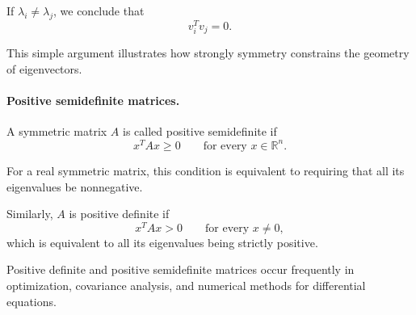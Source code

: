 \documentclass[14pt,letterpaper]{article}
\theoremstyle{plain}
\theoremstyle{definition}
\theoremstyle{remark}
\newcommand{\R}{\mathbb{R}}
\begin{document}
If $\lambda_i\neq\lambda_j$, we conclude that
\[
\boxed{v_i^Tv_j=0.}
\]

This simple argument illustrates how strongly
symmetry constrains the geometry of eigenvectors.

\paragraph{Positive semidefinite matrices.}

A symmetric matrix $A$ is called positive
semidefinite if
\[
x^TAx\geq0
\qquad
\text{for every }x\in\R^n.
\]

For a real symmetric matrix, this condition is
equivalent to requiring that all its eigenvalues
be nonnegative.

Similarly, $A$ is positive definite if
\[
x^TAx>0
\qquad
\text{for every }x\neq0,
\]
which is equivalent to all its eigenvalues
being strictly positive.

Positive definite and positive semidefinite
matrices occur frequently in optimization,
covariance analysis, and numerical methods
for differential equations.
\end{document}
